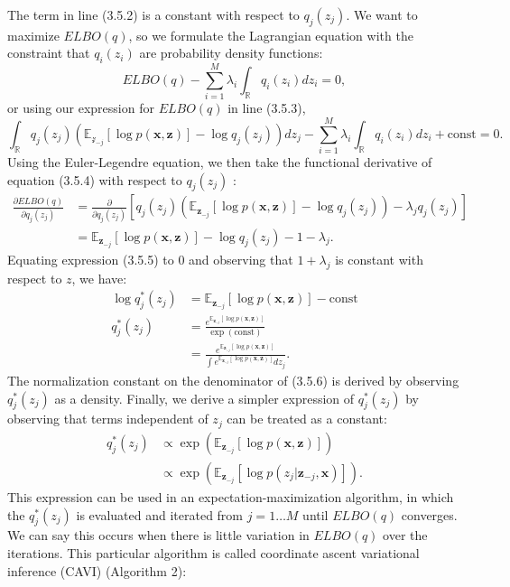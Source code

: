 \documentclass[honours,12pt]{unswthesis}
\newcommand{\R}{\mathbb{R}}
\numberwithin{equation}{section}
\theoremstyle{definition}
\begin{document}
The term in line (3.5.2) is a constant with respect to $q_j(z_j)$. We want to maximize $ELBO(q)$, so we formulate the Lagrangian equation with the constraint that $q_i(z_i)$ are probability density functions:
\begin{equation*}
ELBO(q)-\sum^M_{i=1}\lambda_i\int_\R q_i(z_i)dz_i=0,
\end{equation*}
or using our expression for $ELBO(q)$ in line (3.5.3),
\begin{equation}
\int_\R q_j(z_j)\left(\mathbb{E}_{\mathcal{z}_{-j}}[\log p(\bm{x},\bm{z})]-\log q_j(z_j)\right)dz_j-\sum^M_{i=1}\lambda_i\int_\R q_i(z_i)dz_i+\text{const}=0.
\end{equation} 
Using the Euler-Legendre equation, we then take the functional derivative of equation (3.5.4) with respect to $q_j(z_j)$ \citep{pattern}:
\begin{align}
\frac{\partial ELBO(q)}{\partial q_j(z_j)}&= \frac{\partial}{\partial q_j(z_j)}\left[q_j(z_j)\left(\mathbb{E}_{\bm{z}_{-j}}[\log p(\bm{x},\bm{z})]-\log q_j(z_j)\right)-\lambda_jq_j(z_j)\right]\nonumber
\\&= \mathbb{E}_{\bm{z}_{-j}}[\log p(\bm{x},\bm{z})]-\log q_j(z_j)-1-\lambda_j.
\end{align}
Equating expression (3.5.5) to 0 and observing that $1+\lambda_j$ is constant with respect to $z$, we have:
\begin{align}
\log q_j^*(z_j)&= \mathbb{E}_{\bm{z}_{-j}}[\log p(\bm{x},\bm{z})]-\text{const} \nonumber\\
q_j^*(z_j)&=\frac{e^{\mathbb{E}_{\bm{z}_{-j}}[\log p(\bm{x},\bm{z})]}}{\exp{(\text{const})}}\nonumber\\
&= \frac{e^{\mathbb{E}_{\bm{z}_{-j}}[\log p(\bm{x},\bm{z})]}}{\int e^{\mathbb{E}_{\bm{z}_{-j}}[\log p(\bm{x},\bm{z})]}dz_j}.
\end{align}
\newpage
The normalization constant on the denominator of (3.5.6) is derived by observing $q^*_j(z_j)$ as a density. Finally, we derive a simpler expression of $q^*_j(z_j)$ by observing that terms independent of $z_j$ can be treated as a constant:
\begin{align}
q^*_j(z_j)&\propto \exp\left(\mathbb{E}_{\bm{z}_{-j}}[\log p(\bm{x},\bm{z})]\right)\nonumber\\
&\propto \exp\left(\mathbb{E}_{\bm{z}_{-j}}[\log p(z_j|\bm{z}_{-j},\bm{x})]\right).
\end{align}
This expression can be used in an expectation-maximization algorithm, in which the $q^*_j(z_j)$ is evaluated and iterated from $j=1\dots M$ until $ELBO(q)$ converges. We can say this occurs when there is little variation in $ELBO(q)$ over the iterations. This particular algorithm is called coordinate ascent variational inference (CAVI) (Algorithm 2):\\
\end{document}
